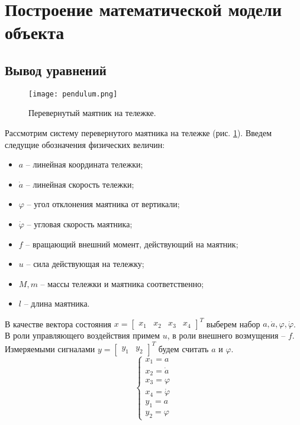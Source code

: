 \tableofcontents

\pagebreak

\section{Построение математической модели объекта}
\subsection{Вывод уравнений}
\begin{figure}[h]
    \centering
    \texttt{[image: pendulum.png]}
    \caption{\label{fig:task1_1}Перевернутый маятник на тележке.}
\end{figure}

Рассмотрим систему перевернутого маятника на тележке (рис. \ref{fig:task1_1}). Введем следущие обозначения физических величин:
\begin{itemize}
    \item $a$ -- линейная координата тележки;
    \item $\dot{a}$ -- линейная скорость тележки;
    \item $\varphi$ -- угол отклонения маятника от вертикали;
    \item $\dot{\varphi}$ -- угловая скорость маятника;
    \item $f$ -- вращающий внешний момент, действующий на маятник;
    \item $u$ -- сила действующая на тележку;
    \item $M, m$ --  массы тележки и маятника соответственно;
    \item $l$ -- длина маятника.
\end{itemize}

В качестве вектора состояния $x = \begin{bmatrix}
    x_1 & x_2 & x_3 & x_4
\end{bmatrix}^T$ выберем набор $a, \dot{a}, \varphi, \dot{\varphi}$. В роли управляющего воздействия примем $u$, в роли внешнего возмущения -- $f$.
Измеряемыми сигналами $y = \begin{bmatrix}
    y_1 & y_2
\end{bmatrix}^T$ будем считать $a$ и $\varphi$.
\begin{equation} \label{eq:1}
    \begin{cases}
        x_1 = a \\ x_2 = \dot{a} \\ x_3 = \varphi \\ x_4 = \dot{\varphi} \\ y_1 = a \\ y_2 = \varphi
    \end{cases}
\end{equation}

